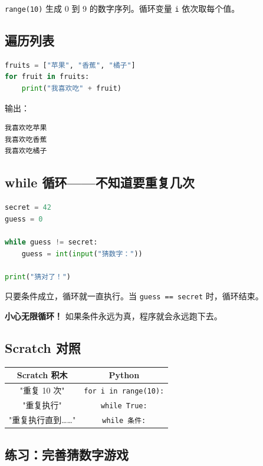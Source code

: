 \documentclass[a4paper,12pt]{ctexart}
\begin{document}
\texttt{range(10)} 生成 0 到 9 的数字序列。循环变量 \texttt{i} 依次取每个值。

\subsection*{遍历列表}

\begin{lstlisting}[language=Python]
fruits = ["苹果", "香蕉", "橘子"]
for fruit in fruits:
    print("我喜欢吃" + fruit)
\end{lstlisting}

输出：
\begin{lstlisting}
我喜欢吃苹果
我喜欢吃香蕉
我喜欢吃橘子
\end{lstlisting}

\subsection*{while 循环——不知道要重复几次}

\begin{lstlisting}[language=Python]
secret = 42
guess = 0

while guess != secret:
    guess = int(input("猜数字："))
    
print("猜对了！")
\end{lstlisting}

只要条件成立，循环就一直执行。当 \texttt{guess == secret} 时，循环结束。

\textbf{小心无限循环！} 如果条件永远为真，程序就会永远跑下去。

\subsection*{Scratch 对照}

\begin{center}
\begin{tabular}{|c|c|}
\hline
\textbf{Scratch 积木} & \textbf{Python} \\ \hline
"重复 10 次" & \texttt{for i in range(10):} \\ \hline
"重复执行" & \texttt{while True:} \\ \hline
"重复执行直到……" & \texttt{while 条件:} \\ \hline
\end{tabular}
\end{center}

\subsection*{练习：完善猜数字游戏}
\end{document}
